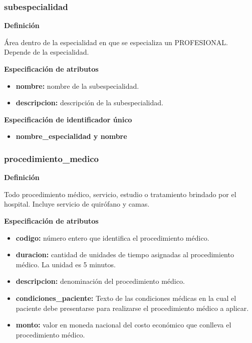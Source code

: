 \documentclass[a4paper,11pt]{article}
\begin{document}
\subsubsection{\textbf{subespecialidad}}

\textbf{Definición}

Área dentro de la especialidad en que se especializa un PROFESIONAL. Depende de 
la especialidad.

\textbf{Especificación de atributos}

\begin{itemize}

     \item \textbf{nombre:} nombre de la subespecialidad.

     \item \textbf{descripcion:} descripción de la subespecialidad.

\end{itemize}

\textbf{Especificación de identificador único}

\begin{itemize}

      \item \textbf{nombre\_especialidad y nombre}

\end{itemize}

\subsubsection{\textbf{procedimiento\_medico}}

\textbf{Definición}

Todo procedimiento médico, servicio, estudio o tratamiento brindado por el hospital. 
Incluye servicio de quirófano y camas.

\textbf{Especificación de atributos}

\begin{itemize}

     \item \textbf{codigo:} número entero que identifica el procedimiento médico.

     \item \textbf{duracion:} cantidad de unidades de tiempo asignadas al procedimiento médico. La unidad es 5 minutos.

     \item \textbf{descripcion:} denominación del procedimiento médico.

     \item \textbf{condiciones\_paciente:} Texto de las condiciones médicas en la cual el paciente 
     debe presentarse para realizarse el procedimiento médico a aplicar.

     \item \textbf{monto:} valor en moneda nacional del costo económico que conlleva el procedimiento médico.

\end{itemize}
\end{document}
